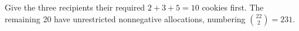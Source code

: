 Give the three recipients their required $2+3+5=10$ cookies first. The remaining 20 have unrestricted nonnegative allocations, numbering $\binom{22}2=\boxed{231}$.
